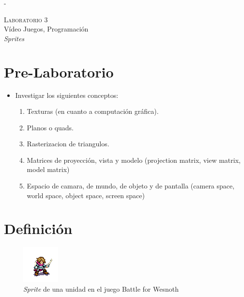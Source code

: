 -\begin{center}
\textsc{\Large Laboratorio 3}~\\
{\large Vídeo Juegos, Programación}~\\
\emph{Sprites}
\end{center}

\section{Pre-Laboratorio}
\begin{itemize}
\item Investigar los siguientes conceptos:
\begin{enumerate}
  \item Texturas (en cuanto a computación gráfica).
  \item Planos o quads.
  \item Rasterizacion de triangulos.
  \item Matrices de proyección, vista y modelo (projection matrix, view matrix, model matrix)
  \item Espacio de camara, de mundo, de objeto y de pantalla (camera space, world space, object space, screen space)
\end{enumerate}
\end{itemize}
\section{Definición}
\setlength\intextsep{0pt}
\begin{figure}
\includegraphics[width=\linewidth]{semana3/sprite_ej1.png} 
\caption{\emph{Sprite} de una unidad en el juego Battle for Wesnoth \cite{wesnothgame}}
\end{figure}

